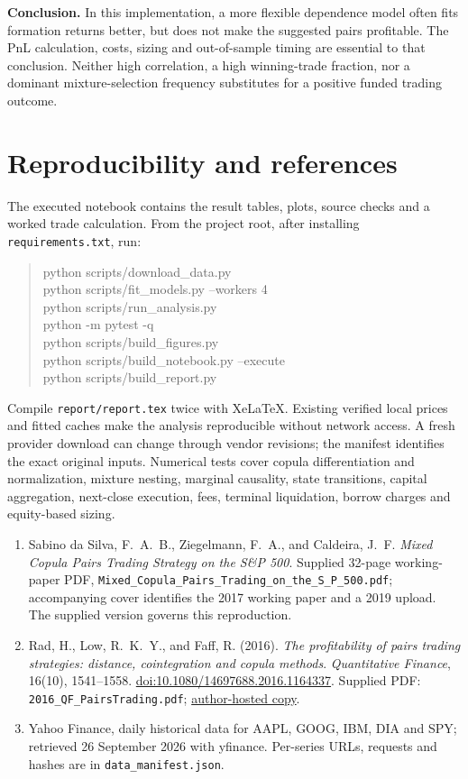 \documentclass[11pt,letterpaper]{article}
\begin{document}
\textbf{Conclusion.} In this implementation, a more flexible dependence model often fits formation returns better, but does not make the suggested pairs profitable. The PnL calculation, costs, sizing and out-of-sample timing are essential to that conclusion. Neither high correlation, a high winning-trade fraction, nor a dominant mixture-selection frequency substitutes for a positive funded trading outcome.

\section{Reproducibility and references}
The executed notebook contains the result tables, plots, source checks and a worked trade calculation. From the project root, after installing \texttt{requirements.txt}, run:
\begin{quote}\small\ttfamily
python scripts/download\_data.py\\
python scripts/fit\_models.py --workers 4\\
python scripts/run\_analysis.py\\
python -m pytest -q\\
python scripts/build\_figures.py\\
python scripts/build\_notebook.py --execute\\
python scripts/build\_report.py
\end{quote}
Compile \texttt{report/report.tex} twice with XeLaTeX. Existing verified local prices and fitted caches make the analysis reproducible without network access. A fresh provider download can change through vendor revisions; the manifest identifies the exact original inputs. Numerical tests cover copula differentiation and normalization, mixture nesting, marginal causality, state transitions, capital aggregation, next-close execution, fees, terminal liquidation, borrow charges and equity-based sizing.

\begin{enumerate}
\item Sabino da Silva, F.~A.~B., Ziegelmann, F.~A., and Caldeira, J.~F. \emph{Mixed Copula Pairs Trading Strategy on the S\&P 500}. Supplied 32-page working-paper PDF, \texttt{Mixed\_Copula\_Pairs\_Trading\_on\_the\_S\_P\_500.pdf}; accompanying cover identifies the 2017 working paper and a 2019 upload. The supplied version governs this reproduction.
\item Rad, H., Low, R.~K.~Y., and Faff, R. (2016). \emph{The profitability of pairs trading strategies: distance, cointegration and copula methods}. \emph{Quantitative Finance}, 16(10), 1541--1558. \href{https://doi.org/10.1080/14697688.2016.1164337}{doi:10.1080/14697688.2016.1164337}. Supplied PDF: \texttt{2016\_QF\_PairsTrading.pdf}; \href{https://randlow.github.io/2016_QF_PairsTrading.pdf}{author-hosted copy}.
\item Yahoo Finance, daily historical data for AAPL, GOOG, IBM, DIA and SPY; retrieved 26 September 2026 with yfinance. Per-series URLs, requests and hashes are in \texttt{data\_manifest.json}.
\end{enumerate}
\end{document}
